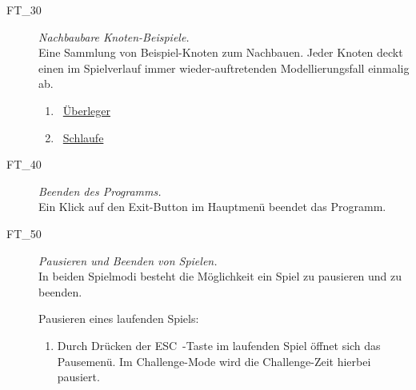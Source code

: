 \begin{description}
\begin{enumerate}
	\end{enumerate}


	
\label{FT:30}
	
	\item[FT\_30] \textit{Nachbaubare Knoten-Beispiele.} \hfill\\
	
	Eine Sammlung von Beispiel-Knoten zum Nachbauen. Jeder Knoten deckt einen im Spielverlauf immer wieder-auftretenden Modellierungsfall einmalig ab. 
	
	\begin{enumerate}
	
		\label{FT:30:Ueberleger}
		\item \mousecursor~\hyperref[Abb:Test-Knoten:Ueberleger]{\glqq Überleger\grqq}
		
		\label{FT:30:Schlaufe}
		\item \mousecursor~\hyperref[Abb:Test-Knoten:Schlaufe]{\glqq Schlaufe\grqq}
		~\\

	\end{enumerate}


	
\label{FT:40}
	
	\item[FT\_40] \textit{Beenden des Programms.} \hfill\\
	
	Ein Klick auf den \glqq Exit\grqq-Button im Hauptmenü beendet das Programm.
	~\\



\label{FT:50}

	\item[FT\_50] \textit{Pausieren und Beenden von Spielen.}  \hfill\\
	
	In beiden Spielmodi besteht die Möglichkeit ein Spiel zu pausieren und zu beenden.
	
	Pausieren eines laufenden Spiels:

	\begin{enumerate} 
	
		\item Durch Drücken der \glqq ESC\grqq~-Taste im laufenden Spiel öffnet sich das Pausemenü. Im Challenge-Mode wird die Challenge-Zeit hierbei pausiert.
		

\end{enumerate}
\end{description}
